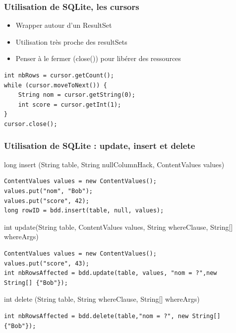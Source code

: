 \documentclass{beamer}
\begin{document}
\begin{frame}[fragile]
\frametitle{Utilisation de SQLite, les cursors}
\begin{itemize}
    \item Wrapper autour d'un ResultSet
    \item Utilisation très proche des resultSets
    \item Penser à le fermer (close()) pour libérer des ressources
\end{itemize}
\begin{lstlisting}
int nbRows = cursor.getCount();
while (cursor.moveToNext()) {
    String nom = cursor.getString(0);
    int score = cursor.getInt(1);
}
cursor.close();
\end{lstlisting}
\end{frame}
\begin{frame}[fragile]
\frametitle{Utilisation de SQLite : update, insert et delete}
long insert (String table, String nullColumnHack, ContentValues values)
\begin{lstlisting}
ContentValues values = new ContentValues();
values.put("nom", "Bob");
values.put("score", 42);
long rowID = bdd.insert(table, null, values);
\end{lstlisting}
int update(String table, ContentValues values, String whereClause, String[] whereArgs)
\begin{lstlisting}
ContentValues values = new ContentValues();
values.put("score", 43);
int nbRowsAffected = bdd.update(table, values, "nom = ?",new String[] {"Bob"});
\end{lstlisting}
int delete (String table, String whereClause, String[] whereArgs)
\begin{lstlisting}
int nbRowsAffected = bdd.delete(table,"nom = ?", new String[] {"Bob"});
\end{lstlisting}
\end{frame}
\end{document}
